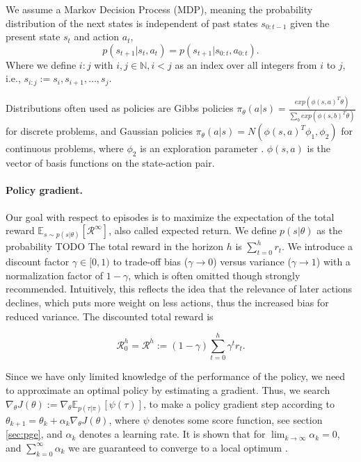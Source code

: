 We assume a Markov Decision Process (MDP), meaning the probability distribution of the next states is independent of past states $s_{0:t-1}$ given the present state $s_t$ and action $a_t$, 
\begin{equation}
	p(s_{t+1}|s_t,a_t)=p(s_{t+1}|s_{0:t},a_{0:t}).
\end{equation}
Where we define $i:j$ with $i,j \in \mathbb{N}, i < j$ as an index over all integers from $i$ to $j$, i.e., $s_{i:j} := s_i, s_{i+1}, \dots, s_j$. 

Distributions often used as policies are Gibbs policies $\pi_\theta(a|s) = \frac{exp(\phi(s,a)^T\theta)}{\sum_b exp(\phi(s,b)^T\theta)}$ \cite{Sutton:1999:PGM:3009657.3009806,Bagnell2004LearningD} for discrete problems, and Gaussian policies $\pi_\theta(a|s) = N(\phi(s,a)^T\phi_1,\phi_2)$ for continuous problems, where $\phi_2$ is an exploration parameter \cite{Williams92simplestatistical,peter:article:1996}. 
$\phi(s,a)$ is the vector of basis functions on the state-action pair.

\paragraph{Policy gradient.} 
Our goal with respect to episodes is to maximize the expectation of the total reward $\mathbb{E}_{s\sim p(s|\theta)}\left[\mathcal{R}^\infty\right]$, also called expected return. 
We define $p(s|\theta)$ as the probability TODO
The total reward in the horizon $h$ is $\sum_{t=0}^{h} r_{t}$. 
We introduce a discount factor $\gamma \in [0,1)$ to trade-off bias ($\gamma\to0$) versus variance ($\gamma\to1$) with a normalization factor of $1-\gamma$, which is often omitted though strongly recommended.
Intuitively, this reflects the idea that the relevance of later actions declines, which puts more weight on less actions, thus the increased bias for reduced variance. 
The discounted total reward is 

\begin{equation}
  \mathcal{R}_0^h = \mathcal{R}^h := (1-\gamma) \sum_{t=0}^{h} \gamma^t r_t.
  \label{eqn:acc-reward}
\end{equation}

Since we have only limited knowledge of the performance of the policy, we need to approximate an optimal policy by estimating a gradient. 
Thus, we search $\nabla_\theta J(\theta) := \nabla_\theta \mathbb{E}_{p(\tau|\pi)}\left[\psi(\tau)\right]$, to make a policy gradient step according to $\theta_{k+1} = \theta_k + \alpha_k \nabla_\theta J(\theta)$, where $\psi$ denotes some score function, see section \ref{sec:pge}, and $\alpha_k$ denotes a learning rate. 
It is shown that for $\lim_{k\to\infty}\alpha_k = 0$, and $\sum_{k=0}^\infty \alpha_k$ we are guaranteed to converge to a local optimum \cite{Sutton:1999:PGM:3009657.3009806}.


